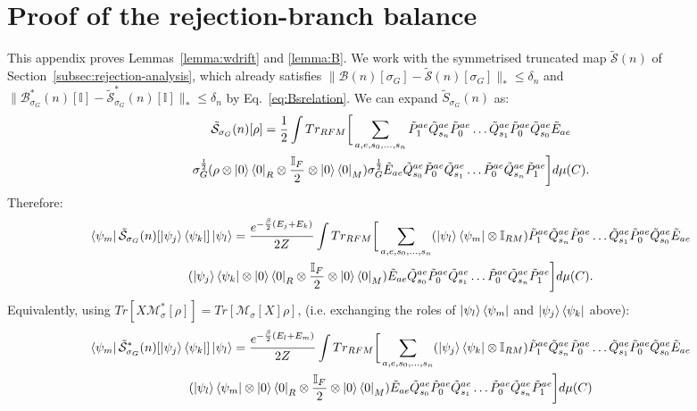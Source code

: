 \documentclass[aps,floatfix,10pt,amssymb,amsfont,amsmath,superscriptaddress,float,nofootinbib,longbibliography,nobalancelastpage,twocolumn]{revtex4-2}
\begin{document}
\section{Proof of the rejection-branch balance}
\label{app:rejectproof}
This appendix proves Lemmas~\ref{lemma:wdrift} and \ref{lemma:B}. We work with the symmetrised truncated map $\tilde{\mathcal{S}}(n)$ of Section~\ref{subsec:rejection-analysis}, which already satisfies $\|\mathcal{B}(n)[\sigma_G] - \tilde{\mathcal{S}}(n)[\sigma_G]\|_* \leq \delta_n$ and $\|\mathcal{B}^*_{\sigma_G}(n)[\mathbb{I}] - \tilde{\mathcal{S}}^*_{\sigma_G}(n)[\mathbb{I}]\|_* \leq \delta_n$ by Eq.~\eqref{eq:Bsrelation}.
We can expand $\tilde S_{\sigma_G}(n)$ as:
\begin{multline}
    \tilde{\mathcal{S}}_{\sigma_G}(n)[\rho] = \frac12\int Tr_{RFM}\bigg[ \sum_{a,e,s_0,\ldots,s_n}\tilde P^{ae}_1\tilde Q^{ae}_{s_n}\tilde P^{ae}_0\ldots \tilde Q^{ae}_{s_1}\tilde P^{ae}_0\tilde Q^{ae}_{s_0}\tilde E_{ae} \\\sigma_G^{\frac{1}{2}}(\rho\otimes \ket{0}\bra{0}_R\otimes \frac{\mathbb{I}_F}{2}\otimes \ket{0}\bra{0}_M)\sigma_G^{\frac{1}{2}}  \tilde E_{ae}\tilde Q^{ae}_{s_0}\tilde P^{ae}_0\tilde Q^{ae}_{s_1}\ldots\tilde P^{ae}_0\tilde Q^{ae}_{s_n}\tilde P^{ae}_1\bigg]d\mu(C).
\end{multline}
Therefore:
\begin{multline}
    \bra{\psi_m}\tilde{\mathcal{S}}_{\sigma_G}(n)[\ket{\psi_j}\bra{\psi_k}]\ket{\psi_l} = \frac{e^{-\frac{\beta}{2}(E_j+E_k)}}{2Z}\int Tr_{RFM}\bigg[ \sum_{a,e,s_0,\ldots,s_n}(\ket{\psi_l}\bra{\psi_m}\otimes \mathbb{I}_{RM})\tilde P^{ae}_1\tilde Q^{ae}_{s_n}\tilde P^{ae}_0\ldots\tilde Q^{ae}_{s_1}\tilde P^{ae}_0\tilde Q^{ae}_{s_0}\tilde E_{ae} \\(\ket{\psi_j}\bra{\psi_k}\otimes \ket{0}\bra{0}_R\otimes \frac{\mathbb{I}_F}{2}\otimes \ket{0}\bra{0}_M)  \tilde E_{ae}\tilde Q^{ae}_{s_0}\tilde P^{ae}_0\tilde Q^{ae}_{s_1}\ldots\tilde P^{ae}_0\tilde Q^{ae}_{s_n}\tilde P^{ae}_1\bigg]d\mu(C).
\end{multline}
Equivalently, using $Tr[X\mathcal{M}^*_{\sigma}[\rho]] = Tr[\mathcal{M}_{\sigma}[X]\rho]$, (i.e. exchanging the roles of $\ket{\psi_l}\bra{\psi_m}$ and $\ket{\psi_j}\bra{\psi_k}$ above):
\begin{multline}
       \bra{\psi_m}\tilde{\mathcal{S}}^*_{\sigma_G}(n)[\ket{\psi_j}\bra{\psi_k}]\ket{\psi_l} = \frac{e^{-\frac{\beta}{2}(E_l+E_m)}}{2Z}\int Tr_{RFM}\bigg[ \sum_{a,e,s_0,\ldots,s_n}(\ket{\psi_j}\bra{\psi_k}\otimes \mathbb{I}_{RM})\tilde P^{ae}_1\tilde Q^{ae}_{s_n}\tilde P^{ae}_0\ldots\tilde Q^{ae}_{s_1}\tilde P^{ae}_0\tilde Q^{ae}_{s_0}\tilde E_{ae} \\(\ket{\psi_l}\bra{\psi_m}\otimes \ket{0}\bra{0}_R\otimes \frac{\mathbb{I}_F}{2}\otimes \ket{0}\bra{0}_M)  \tilde E_{ae}\tilde Q^{ae}_{s_0}\tilde P^{ae}_0\tilde Q^{ae}_{s_1}\ldots\tilde P^{ae}_0\tilde Q^{ae}_{s_n}\tilde P^{ae}_1\bigg]d\mu(C)
    \label{eq:Bstarexpanded}
\end{multline}
\end{document}
